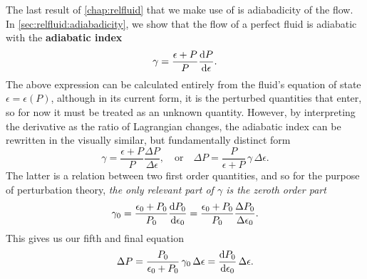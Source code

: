 The last result of \cref{chap:relfluid} that we make use of is adiabadicity of the flow.
In \cref{sec:relfluid:adiabadicity}, we show that the flow of a perfect fluid is adiabatic with the \textbf{adiabatic index}
\begin{equation}
	\gamma = \frac{\epsilon+P}{P} \odv{P}{\epsilon} .
\label{eq:nstars:adiabatic_index0}
\end{equation}
The above expression can be calculated entirely from the fluid's equation of state $\epsilon = \epsilon(P)$, although in its current form, it is the perturbed quantities that enter, so for now it must be treated as an unknown quantity.
However, by interpreting the derivative as the ratio of Lagrangian changes, the adiabatic index can be rewritten in the visually similar, but fundamentally distinct form
\begin{equation}
	\gamma = 
	\frac{\epsilon+P}{P} \frac{\Delta P}{\Delta \epsilon} ,
	\quad \text{or} \quad
	\Delta P = \frac{P}{\epsilon + P} \, \gamma \, \Delta \epsilon .
\label{eq:nstars:adiabatic_index}
\end{equation}
The latter is a relation between two first order quantities, and so for the purpose of perturbation theory, \emph{the only relevant part of $\gamma$ is the zeroth order part}
\begin{equation}
	\gamma_0 = \frac{\epsilon_0+P_0}{P_0} \odv{P_0}{\epsilon_0}
	         = \frac{\epsilon_0+P_0}{P_0} \frac{\Delta P_0}{\Delta \epsilon_0} .
\end{equation}
This gives us our fifth and final equation
\begin{equation}
	\Delta P = \frac{P_0}{\epsilon_0 + P_0} \, \gamma_0 \, \Delta \epsilon
	         = \odv{P_0}{\epsilon_0} \, \Delta\epsilon .
\label{eq:nstars:Delta_P}
\end{equation}

